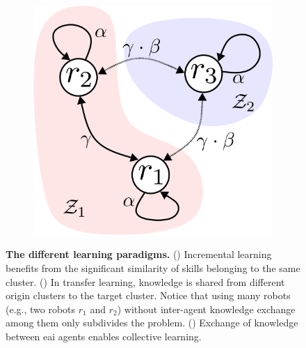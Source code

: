 \documentclass[12pt]{article}
\begin{document}
\begin{figure}[!t]
\begin{subfigure}[t]{0.32\textwidth}
	\end{subfigure}
	\hfill
	\begin{subfigure}[t]{0.32\textwidth}
		\subcaption{}
		\includegraphics[width=\textwidth]{cl_example_figure.png} \label{fig:cl_example_figure}
	\end{subfigure}	
	\hspace*{\fill}
	\caption[] {\label{fig:learning_paradigms_conceptual_figure} \textbf{The different learning paradigms.} () Incremental learning benefits from the significant similarity of skills belonging to the same cluster. () In transfer learning, knowledge is shared from different origin clusters to the target cluster. Notice that using many robots (e.g., two robots $r_1$ and $r_2$) without inter-agent knowledge exchange among them only subdivides the problem. () Exchange of knowledge between \ac{eai} agents enables collective learning.}
\end{figure}

\end{document}
